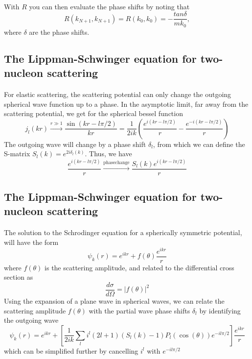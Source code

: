 \documentclass[%
twoside,                 %
final,                   %
10pt]{article}
\begin{document}
\paragraph{}
With $R$ you can then evaluate the phase shifts
by noting that 
\[
      R(k_{N+1},k_{N+1})=R(k_0,k_0)=-\frac{tan\delta}{mk_0},
\]
where $\delta$ are the phase shifts.



\subsection*{The Lippman-Schwinger equation for two-nucleon scattering}

\paragraph{}
For elastic scattering, the scattering potential can only change the outgoing spherical wave function up to a phase. In the asymptotic limit, far away from the scattering potential, we get for the spherical bessel function
\[
j_l(kr) \xrightarrow[]{ r \gg 1} \frac{\sin(kr -l\pi/2)}{kr} =  \frac{1}{2ik}\left( \frac{e^{i(kr-l\pi/2)}}{r} - \frac{e^{-i(kr-l\pi/2)}}{r}\right)
\]
The outgoing wave will change by a phase shift $\delta_l$, from which we can define the S-matrix $S_l(k) = e^{2i\delta_l(k)}$. Thus, we have
\[
 \frac{e^{i(kr-l\pi/2)}}{r} \xrightarrow[]{\mathrm{phase change}}  \frac{S_l(k)e^{i(kr-l\pi/2)}}{r}
\]



\subsection*{The Lippman-Schwinger equation for two-nucleon scattering}

\paragraph{}
The solution to the Schrodinger equation for a spherically symmetric potential, will have the form
\[
\psi_k(r) = e^{ikr} + f(\theta)\frac{e^{ikr}}{r}
\]
where $f(\theta)$ is the scattering amplitude, and related to the differential cross section as
\[
\frac{d\sigma}{d\Omega} = |f(\theta)|^2
\]
Using the expansion of a plane wave in spherical waves, we can relate the scattering amplitude $f(\theta)$ with the partial wave phase shifts $\delta_l$ by identifying the outgoing wave 
\[
\psi_k(r) = e^{ikr} + \left[\frac{1}{2ik}\sum_l i^l (2l+1) (S_l(k)-1)P_l(\cos(\theta))e^{-il\pi/2}\right] \frac{e^{ikr}}{r}
\]
which can be simplified further by cancelling $i^l$ with $e^{-il\pi/2}$
\end{document}
